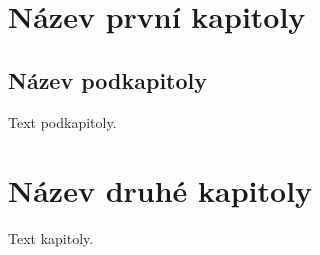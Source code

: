 \chapter{Název první kapitoly}

\section{Název podkapitoly}

Text podkapitoly.

\chapter{Název druhé kapitoly}

Text kapitoly.
